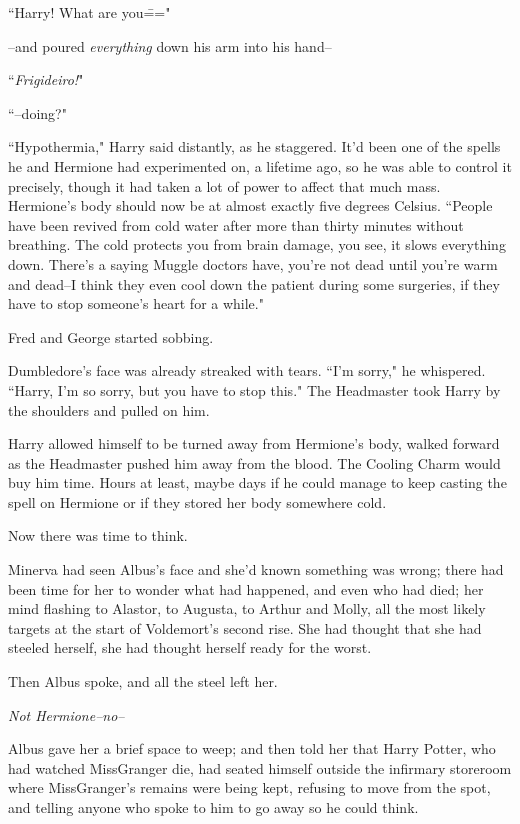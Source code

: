 ``Harry! What are you\==="

\---and poured \emph{everything} down his arm into his hand\---

``\emph{Frigideiro!}"

``\---doing?"

``Hypothermia," Harry said distantly, as he staggered. It'd been one of the spells he and Hermione had experimented on, a lifetime ago, so he was able to control it precisely, though it had taken a lot of power to affect that much mass. Hermione's body should now be at almost exactly five degrees Celsius. ``People have been revived from cold water after more than thirty minutes without breathing. The cold protects you from brain damage, you see, it slows everything down. There's a saying Muggle doctors have, you're not dead until you're warm and dead\---I think they even cool down the patient during some surgeries, if they have to stop someone's heart for a while."

Fred and George started sobbing.

Dumbledore's face was already streaked with tears. ``I'm sorry," he whispered. ``Harry, I'm so sorry, but you have to stop this." The Headmaster took Harry by the shoulders and pulled on him.

Harry allowed himself to be turned away from Hermione's body, walked forward as the Headmaster pushed him away from the blood. The Cooling Charm would buy him time. Hours at least, maybe days if he could manage to keep casting the spell on Hermione or if they stored her body somewhere cold.

Now there was time to think.

\later

Minerva had seen Albus's face and she'd known something was wrong; there had been time for her to wonder what had happened, and even who had died; her mind flashing to Alastor, to Augusta, to Arthur and Molly, all the most likely targets at the start of Voldemort's second rise. She had thought that she had steeled herself, she had thought herself ready for the worst.

Then Albus spoke, and all the steel left her.

\emph{Not Hermione\---no\---}

Albus gave her a brief space to weep; and then told her that Harry Potter, who had watched Miss\?Granger die, had seated himself outside the infirmary storeroom where Miss\?Granger's remains were being kept, refusing to move from the spot, and telling anyone who spoke to him to go away so he could think.

